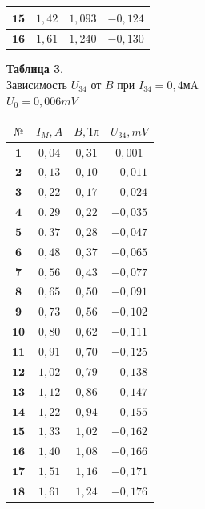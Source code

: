 \documentclass[11pt,a4paper]{article}
\begin{document}
\begin{paracol}{2}
\begin{table}[h!]
\begin{center}
\begin{tabular}{|c|c|c|c|}
			$\textbf{15}$ & $1,42$ & $1,093$  & $-0,124$ \\ \hline
			$\textbf{16}$ & $1,61$ & $1,240$  & $-0,130$ \\ \hline
		\end{tabular}
	\end{center}
\end{table}
\switchcolumn
	\begin{table}[h!]
	\begin{center}
		\textbf{Таблица 3}. \\ Зависимость $U_{34}$ от $B$ при $I_{34} = 0,4 \text{мA}$\\
		$U_0 = 0,006 mV$
		\\
		\begin{tabular}{|c|c|c|c|}
			\hline
			$\text{№}$  & $I_M,A$ & $B,\text{Тл}$ & $U_{34},mV$ \\ \hline
			$\textbf{1}$ & $0,04$ & $0,31$  & $0,001$ \\ \hline
			$\textbf{2}$ & $0,13$ & $0,10$  & $-0,011$ \\ \hline
			$\textbf{3}$ & $0,22$ & $0,17$  & $-0,024$ \\ \hline
			$\textbf{4}$ & $0,29$ & $0,22$  & $-0,035$ \\ \hline
			$\textbf{5}$ & $0,37$ & $0,28$  & $-0,047$ \\ \hline
			$\textbf{6}$ & $0,48$ & $0,37$  & $-0,065$ \\ \hline
			$\textbf{7}$ & $0,56$ & $0,43$  & $-0,077$ \\ \hline
			$\textbf{8}$ & $0,65$ & $0,50$  & $-0,091$ \\ \hline
			$\textbf{9}$ & $0,73$ & $0,56$  & $-0,102$ \\ \hline
			$\textbf{10}$ & $0,80$ & $0,62$  & $-0,111$ \\ \hline
			$\textbf{11}$ & $0,91$ & $0,70$  & $-0,125$ \\ \hline
			$\textbf{12}$ & $1,02$ & $0,79$  & $-0,138$ \\ \hline
			$\textbf{13}$ & $1,12$ & $0,86$  & $-0,147$ \\ \hline
			$\textbf{14}$ & $1,22$ & $0,94$  & $-0,155$ \\ \hline
			$\textbf{15}$ & $1,33$ & $1,02$  & $-0,162$ \\ \hline
			$\textbf{16}$ & $1,40$ & $1,08$  & $-0,166$ \\ \hline
			$\textbf{17}$ & $1,51$ & $1,16$  & $-0,171$ \\ \hline
			$\textbf{18}$ & $1,61$ & $1,24$  & $-0,176$ \\ \hline
		\end{tabular}
	\end{center}
\end{table}
\end{paracol}
\end{document}
